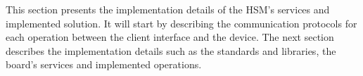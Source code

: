 \cleardoublepage
\label{chap:implementation}

This section presents the implementation details of the HSM's services and implemented solution. It will start by describing the communication protocols for each operation between the client interface and the device. The next section describes the implementation details such as the standards and libraries, the board's services and implemented operations.

%
%
%
%
%
